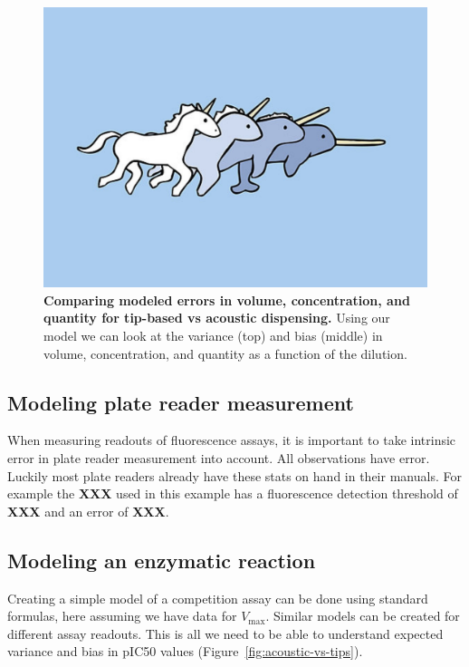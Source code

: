 \documentclass[aps,pre,twocolumn,nofootinbib,superscriptaddress,linenumbers]{revtex4-1}
\begin{document}
\begin{figure}[tb]
    \includegraphics[width=1.0\textwidth]{../figures/placeholder.pdf}

  \caption{{\bf Comparing modeled errors in volume, concentration, and quantity for tip-based vs acoustic dispensing.}
  Using our model we can look at the variance (top) and bias (middle) in volume, concentration, and quantity as a function of the dilution.
  }
  \label{fig:volumes-n-concentrations}
\end{figure}


\subsection*{Modeling plate reader measurement}

When measuring readouts of fluorescence assays, it is important to take intrinsic error in plate reader measurement into account. All observations have error. 
Luckily most plate readers already have these stats on hand in their manuals. 
For example the {\bf XXX} used in this example has a fluorescence detection threshold of {\bf XXX} and an error of {\bf XXX}.

\subsection*{Modeling an enzymatic reaction}

Creating a simple model of a competition assay can be done using standard formulas, here assuming we have data for $V_\mathrm{max}$. 
Similar models can be created for different assay readouts.  This is all we need to be able to understand expected variance and bias in  pIC50 values (Figure~\ref{fig:acoustic-vs-tips}).
\end{document}

